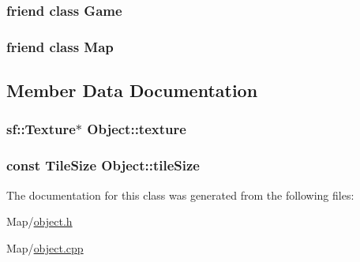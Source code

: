 \subsubsection[{\texorpdfstring{Game}{Game}}]{\setlength{\rightskip}{0pt plus 5cm}friend class Game\hspace{0.3cm}{\ttfamily [friend]}}\hypertarget{classObject_aa2fab026580d6f14280c2ffb8063a314}{}\label{classObject_aa2fab026580d6f14280c2ffb8063a314}
\subsubsection[{\texorpdfstring{Map}{Map}}]{\setlength{\rightskip}{0pt plus 5cm}friend class {\bf Map}\hspace{0.3cm}{\ttfamily [friend]}}\hypertarget{classObject_ad2f32e921244459f7cc6d50355429cc6}{}\label{classObject_ad2f32e921244459f7cc6d50355429cc6}


\subsection{Member Data Documentation}
\subsubsection[{\texorpdfstring{texture}{texture}}]{\setlength{\rightskip}{0pt plus 5cm}sf\+::\+Texture$\ast$ Object\+::texture\hspace{0.3cm}{\ttfamily [protected]}}\hypertarget{classObject_a5279eaf90d320e3437f21298a18688fb}{}\label{classObject_a5279eaf90d320e3437f21298a18688fb}
\subsubsection[{\texorpdfstring{tile\+Size}{tileSize}}]{\setlength{\rightskip}{0pt plus 5cm}const {\bf Tile\+Size} Object\+::tile\+Size}\hypertarget{classObject_a40a932c0593ca2687eebc518b2c84c71}{}\label{classObject_a40a932c0593ca2687eebc518b2c84c71}


The documentation for this class was generated from the following files\+:\begin{DoxyCompactItemize}
\item 
Map/\hyperlink{object_8h}{object.\+h}\item 
Map/\hyperlink{object_8cpp}{object.\+cpp}\end{DoxyCompactItemize}
